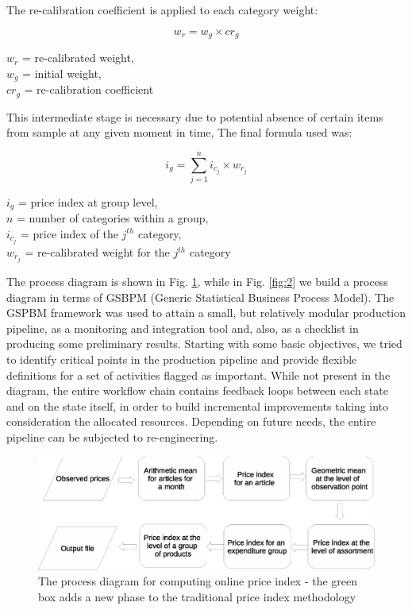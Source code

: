 \documentclass[]{article}
\begin{document}
The re-calibration coefficient is applied to each category weight:

\begin{equation}\label{eq:7}
  w_{r} = w_{g} \times cr_{g}
\end{equation}

\begin{center}
	$w_{r}$ = re-calibrated weight, \\
	$w_{g}$ = initial weight, \\
	$cr_{g}$ = re-calibration coefficient
\end{center}

This intermediate stage is necessary due to potential absence of certain items from sample at any given moment in time, 
The final formula used was:

\begin{equation}\label{eq:8}
	i_{g} = \sum_{j=1}^{n} i_{c_{j}} \times w_{r_{j}}
\end{equation}

\begin{center}
	$i_{g}$ = price index at group level, \\
	$n$ = number of categories within a group, \\
	$i_{c_{j}}$ = price index of the $j^{th}$ category, \\
	$w_{r_{j}}$ = re-calibrated weight for the $j^{th}$ category
\end{center}

The process diagram is shown in Fig. \ref{fig:1}, while in Fig. \ref{fig:2} we build a process diagram in terms of GSBPM (Generic Statistical Business Process Model)\cite{gsbpm}. The GSPBM framework was used to attain a small, but relatively modular production pipeline, as a monitoring and integration tool and, also, as a checklist in producing some preliminary results. Starting with some basic objectives, we tried to identify critical points in the production pipeline and provide flexible definitions for a set of activities flagged as important. While not present in the diagram, the entire workflow chain contains feedback loops between each state and on the state itself, in order to build incremental improvements taking into consideration the allocated resources. Depending on future needs, the entire pipeline can be subjected to re-engineering.      


\begin{figure}
\centering
\includegraphics[width=0.8\linewidth]{fig1.eps}
\caption{The process diagram for computing online price index - the green box adds a new phase to the traditional price index methodology}
\label{fig:1}
\end{figure}
\end{document}

